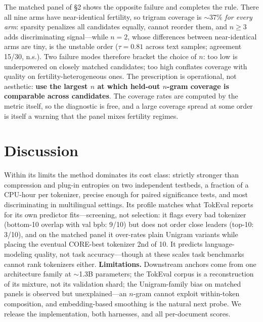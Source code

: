 \documentclass[10pt,twocolumn]{article}
\begin{document}
The matched panel of \S2 shows the opposite failure and completes the rule. There all nine arms have near-identical fertility, so trigram coverage is $\sim$37\% \emph{for every arm}: sparsity penalizes all candidates equally, cannot reorder them, and $n{\geq}3$ adds discriminating signal---while $n{=}2$, whose differences between near-identical arms are tiny, is the unstable order ($\tau{=}0.81$ across text samples; agreement 15/30, n.s.). Two failure modes therefore bracket the choice of $n$: too low is underpowered on closely matched candidates; too high conflates coverage with quality on fertility-heterogeneous ones. The prescription is operational, not aesthetic: \textbf{use the largest $n$ at which held-out $n$-gram coverage is comparable across candidates}. The coverage rates are computed by the metric itself, so the diagnostic is free, and a large coverage spread at some order is itself a warning that the panel mixes fertility regimes.

\section{Discussion}
Within its limits the method dominates its cost class: strictly stronger than compression and plug-in entropies on two independent testbeds, a fraction of a CPU-hour per tokenizer, precise enough for paired significance tests, and most discriminating in multilingual settings. Its profile matches what TokEval reports for its own predictor fits---screening, not selection: it flags every bad tokenizer (bottom-10 overlap with val bpb: 9/10) but does not order close leaders (top-10: 3/10), and on the matched panel it over-rates plain Unigram variants while placing the eventual CORE-best tokenizer 2nd of 10. It predicts language-modeling quality, not task accuracy---though at these scales task benchmarks cannot rank tokenizers either. \textbf{Limitations.} Downstream anchors come from one architecture family at ${\sim}$1.3B parameters; the TokEval corpus is a reconstruction of its mixture, not its validation shard; the Unigram-family bias on matched panels is observed but unexplained---an $n$-gram cannot exploit within-token composition, and embedding-based smoothing is the natural next probe. We release the implementation, both harnesses, and all per-document scores.
\end{document}
